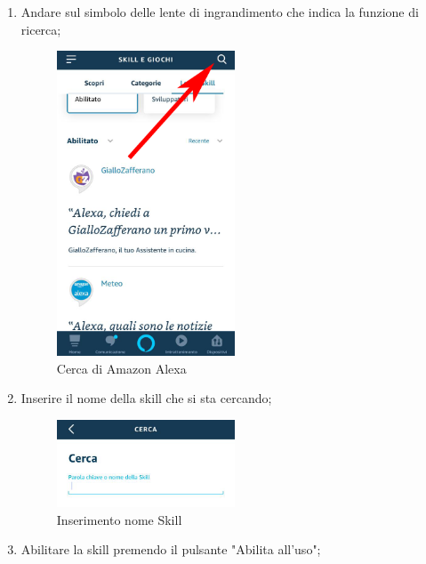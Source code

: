 \begin{itemize}
\begin{enumerate}
	\item Andare sul simbolo delle lente di ingrandimento che indica la funzione di ricerca;
	\begin{figure}[H]
		\centering
		\includegraphics[width=0.5\textwidth]{images/SimboloCerca.png}
		\caption{Cerca di Amazon Alexa}
	\end{figure}
	\item Inserire il nome della skill che si sta cercando;
	\begin{figure}[!ht]
	\centering
	\includegraphics[width=0.5\textwidth]{images/CercaSkill.png}
	\caption{Inserimento nome Skill}
   \end{figure}
\newpage
    \item Abilitare la skill premendo il pulsante "Abilita all'uso";
    

\end{enumerate}
\end{itemize}
